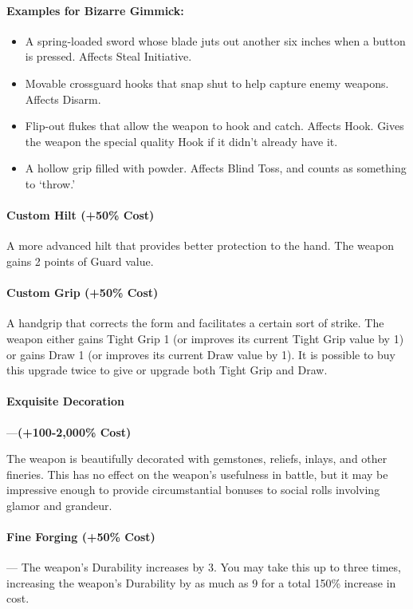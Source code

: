 \documentclass[oneside,11pt,english]{book}
\begin{document}
\paragraph{Examples for Bizarre Gimmick:}
\begin{itemize}
	\item A spring-loaded sword whose blade juts out another six inches when a button is pressed. Affects Steal Initiative.
	\item Movable crossguard hooks that snap shut to help capture enemy weapons. Affects Disarm.
	\item Flip-out flukes that allow the weapon to hook and catch. Affects Hook. Gives the weapon the special quality Hook if it didn’t already have it.
	\item A hollow grip filled with powder. Affects Blind Toss, and counts as something to ‘throw.’
\end{itemize}
\paragraph{Custom Hilt (+50\% Cost)}\par
A more advanced hilt that provides better protection to the hand. The weapon gains 2 points of Guard value.
\paragraph{Custom Grip (+50\% Cost)}\par
A handgrip that corrects the form and facilitates a certain sort of strike. The weapon either gains Tight Grip 1 (or improves its current Tight Grip value by 1) or gains Draw 1 (or improves its current Draw value by 1). It is possible to buy this upgrade twice to give or upgrade both Tight Grip and Draw.
\paragraph{Exquisite Decoration}---\quad \textbf{(+100-2,000\% Cost)} \par
The weapon is beautifully decorated with gemstones, reliefs, inlays, and other fineries. This has no effect on the weapon’s usefulness in battle, but it may be impressive enough to provide circumstantial bonuses to social rolls involving glamor and grandeur.

\paragraph{Fine Forging (+50\% Cost)}---\quad
The weapon’s Durability increases by 3. You may take this up to three times, increasing the weapon’s Durability by as much as 9 for a total 150\% increase in cost.
\end{document}
